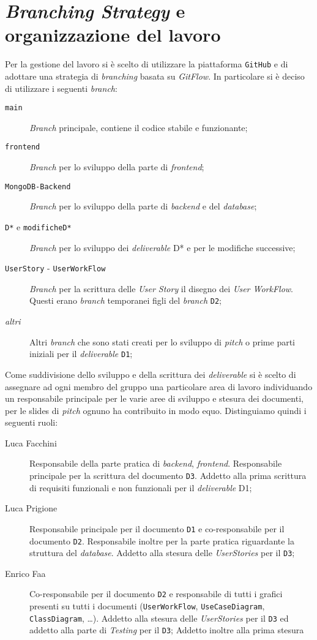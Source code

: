 \section{\textit{Branching Strategy} e organizzazione del lavoro}
    Per la gestione del lavoro si è scelto di utilizzare la piattaforma \texttt{GitHub} e di adottare una strategia di \textit{branching} basata su \textit{GitFlow}. In particolare si è deciso di utilizzare i seguenti \textit{branch}:
    \begin{description}
        \item[\texttt{main}] \textit{Branch} principale, contiene il codice stabile e funzionante;
        \item[\texttt{frontend}] \textit{Branch} per lo sviluppo della parte di \textit{frontend};
        \item[\texttt{MongoDB-Backend}] \textit{Branch} per lo sviluppo della parte di \textit{backend} e del \textit{database};
        \item[\texttt{D*} e \texttt{modificheD*}] \textit{Branch} per lo sviluppo dei \textit{deliverable} D* e per le modifiche successive;
        \item[\texttt{UserStory} - \texttt{UserWorkFlow}] \textit{Branch} per la scrittura delle \textit{User Story} il disegno dei \textit{User WorkFlow}. Questi erano \textit{branch} temporanei figli del \textit{branch} \texttt{D2};
        \item[\textit{altri}] Altri \textit{branch} che sono stati creati per lo sviluppo di \textit{pitch} o prime parti iniziali per il \textit{deliverable} \texttt{D1};
    \end{description}
    Come suddivisione dello sviluppo e della scrittura dei \textit{deliverable} si è scelto di assegnare ad ogni membro del gruppo una particolare area di lavoro individuando un responsabile principale per le varie aree di sviluppo e stesura dei documenti, per le slides di \textit{pitch} ognuno ha contribuito in modo equo. Distinguiamo quindi i seguenti ruoli:
    \begin{description}
        \item[Luca Facchini] Responsabile della parte pratica di \textit{backend}, \textit{frontend}. Responsabile principale per la scrittura del documento \texttt{D3}. Addetto alla prima scrittura di requisiti funzionali e non funzionali per il \textit{deliverable} D1; 
        \item[Luca Prigione] Responsabile principale per il documento \texttt{D1} e co-responsabile per il documento \texttt{D2}. Responsabile inoltre per la parte pratica riguardante la struttura del \textit{database}. Addetto alla stesura delle \textit{UserStories} per il \texttt{D3};
        \item[Enrico Faa] Co-responsabile per il documento \texttt{D2} e responsabile di tutti i grafici presenti su tutti i documenti (\texttt{UserWorkFlow}, \texttt{UseCaseDiagram}, \texttt{ClassDiagram}, \dots). Addetto alla stesura delle \textit{UserStories} per il \texttt{D3} ed addetto alla parte di \textit{Testing} per il \texttt{D3}; Addetto inoltre alla prima stesura 
    \end{description}
